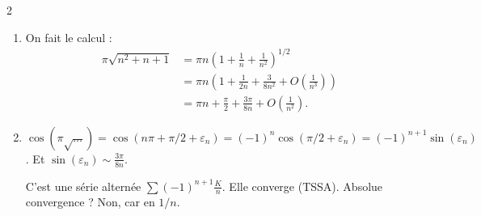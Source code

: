 \begin{correction}{2}
\begin{enumerate}
    \item On fait le calcul :
    \begin{align*}
        \pi\sqrt{n^2+n+1} &= \pi n \left(1 + \frac{1}{n} + \frac{1}{n^2}\right)^{1/2} \\
        &= \pi n \left(1 + \frac{1}{2n} + \frac{3}{8n^2} + O\left(\frac{1}{n^3}\right)\right) \\
        &= \pi n + \frac{\pi}{2} + \frac{3\pi}{8n} + O\left(\frac{1}{n^2}\right).
    \end{align*}
    
    \item $\cos(\pi\sqrt{\dots}) = \cos(n\pi + \pi/2 + \varepsilon_n) = (-1)^n \cos(\pi/2 + \varepsilon_n) = (-1)^{n+1} \sin(\varepsilon_n)$.
    Et $\sin(\varepsilon_n) \sim \frac{3\pi}{8n}$.

    C'est une série alternée $\sum (-1)^{n+1} \frac{K}{n}$. Elle converge (TSSA).
    Absolue convergence ? Non, car en $1/n$.
\end{enumerate}
\end{correction}

